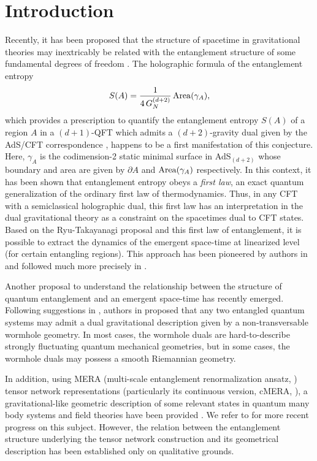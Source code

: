 \documentclass[preprint,aps]{revtex4}
\def\beq{\begin{equation}}
\def\eeq{\end{equation}}
\begin{document}
\section{Introduction}
\label{intro}
Recently, it has been proposed that the structure of spacetime in gravitational theories may inextricably be related with the entanglement structure of some fundamental degrees of freedom \citep{ent_geom1, ent_geom2}. The holographic formula of the entanglement entropy \cite{ryutak}
\beq
\label{eq0.0}
S(A)=\frac{1}{4\, G_N^{(d+2)}}\, {\rm Area}(\gamma_A),
\eeq
which provides a prescription to quantify the entanglement entropy $S(A)$ of a region $A$ in a $(d+1)$-QFT which admits a $(d+2)$-gravity dual given by the AdS/CFT correspondence  \cite{adscftbib2,adscftbib3,adscftbib4}, happens to be a first manifestation of this conjecture. Here, $\gamma_A$ is the codimension-2 static minimal surface in AdS$_{(d+2)}$ whose boundary and area are given by $\partial A$ and ${\rm Area}(\gamma_A)$ respectively. In this context, it has been shown that entanglement entropy obeys a \textit{first law}, an exact quantum generalization of the ordinary first law of thermodynamics. Thus, in any CFT with a semiclassical holographic dual, this first law has an interpretation in the dual gravitational theory as a constraint on the spacetimes dual to CFT states. Based on the Ryu-Takayanagi proposal and this first law of entanglement, it is possible to extract the dynamics of the emergent space-time at linearized level (for certain entangling regions). This approach has been pioneered by authors in \cite{firstlaw1} and followed much more precisely in \cite{firstlaw2}. 

Another proposal to understand the relationship between the structure of quantum entanglement and an emergent space-time has recently emerged. Following suggestions in \cite{ent_geom1}, authors in \cite{ent_geom2} proposed that any two entangled quantum systems may admit a dual gravitational description given by a non-transversable wormhole geometry. In most cases, the wormhole duals are hard-to-describe strongly fluctuating quantum mechanical geometries, but in some cases, the wormhole duals may possess a smooth Riemannian geometry. 

In addition, using MERA (multi-scale entanglement renormalization ansatz, \cite{vidalmera}) tensor network representations (particularly its continuous version, cMERA, \cite{cMERA}), a gravitational-like geometric description of some relevant states in quantum many body systems and field theories have been provided \cite{swingle, taka1}. We refer to \cite{prog1,prog2,prog3,prog4,prog6} for more recent progress on this subject. However, the relation between the entanglement structure underlying the tensor network construction and its geometrical description has been established only on qualitative grounds. 
\end{document}

